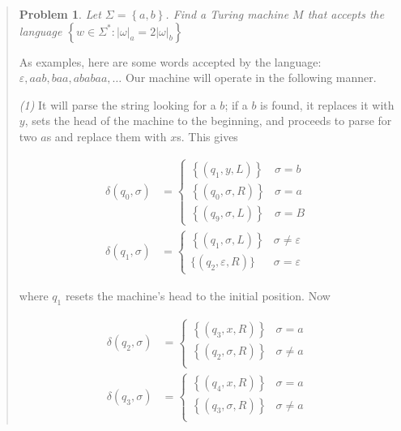 \documentclass[a4paper, 12pt]{article}
\newtheorem{problem}{Problem}
\newtheorem{problem}{Problem}
\begin{document}
\small
\begin{quote}

\begin{problem}
    Let $\Sigma = \left\{ a, b \right\} $. Find a Turing machine $M$ that
    accepts the language $ \left\{ w \in \Sigma^{*} : |\omega|_a = 2|\omega|_b
    \right\} $
\end{problem}

As examples, here are some words accepted by the language: $\varepsilon, aab, baa,
ababaa, \ldots$ Our machine will operate in the following manner.

\textit{(1)} It will parse the string looking for a $b$; if a $b$ is found, it
replaces it with $y$, sets the head of the machine to the beginning, and
proceeds to parse for two $a$s and replace them with $x$s. This gives 

\begin{align*}
    \delta(q_0, \sigma) &= \begin{cases}
        \left\{ \left( q_1, y, L \right)  \right\} & \sigma = b\\
        \left\{ \left( q_0, \sigma, R \right)  \right\} & \sigma = a\\
        \left\{ \left( q_9, \sigma, L \right)  \right\} & \sigma = B
    \end{cases} \\
    \delta(q_1, \sigma) &= \begin{cases}
        \left\{ \left( q_1, \sigma, L \right)  \right\} & \sigma \neq \varepsilon
        \\ 
        \{ (q_2, \varepsilon, R) \} & \sigma = \varepsilon
    \end{cases}
\end{align*}

where $q_1$ resets the machine's head to the initial position. Now 

\begin{align*}
    \delta(q_2, \sigma) &= \begin{cases}
        \left\{ (q_3, x, R) \right\}  & \sigma = a \\ 
        \left\{ (q_2, \sigma, R) \right\}  & \sigma \neq a \\ 
    \end{cases}\\
    \delta(q_3, \sigma) &= \begin{cases}
        \left\{ (q_4, x, R) \right\}  & \sigma = a \\ 
        \left\{ (q_3, \sigma, R) \right\}  & \sigma \neq a \\ 
    \end{cases}
\end{align*}


\end{quote}
\end{document}
